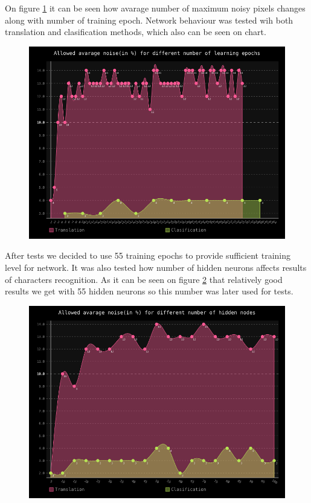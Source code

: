 \documentclass[a4paper]{article}
\begin{document}
On figure \ref{epochs} it can be seen how avarage number of maximum noisy pixels changes along with number of training epoch. Network behaviour was tested wih both translation and clasification methods, which also can be seen on chart.
\begin{figure}[h!]
	\centering
	\includegraphics[scale=0.7,keepaspectratio=true]{Charts/epochsChart.png}	
	\caption{}
	\label{epochs}
\end{figure}
After tests we decided to use 55 training epochs to provide sufficient training level for network.
It was also tested how number of hidden neurons affects results of characters recognition.
As it can be seen on figure \ref{hidden} that relatively good results we get with 55 hidden neurons so this number was later used for tests.
\begin{figure}[h!]
	\centering
	\includegraphics[scale=0.7,keepaspectratio=true]{Charts/hiddenChart.png}	
	\caption{}
	\label{hidden}
\end{figure} 
\end{document}
